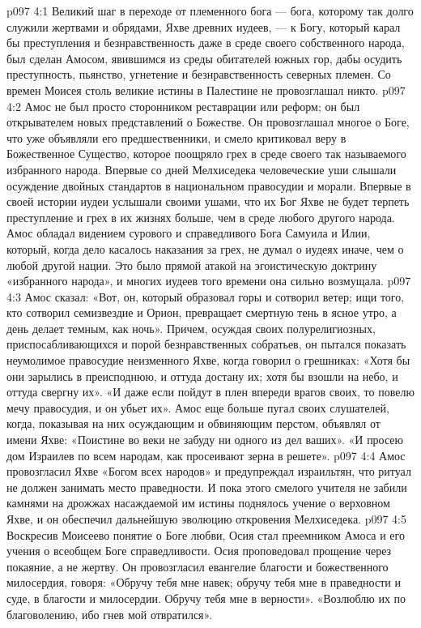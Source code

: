 \vs p097 4:1 Великий шаг в переходе от племенного бога --- бога, которому так долго служили жертвами и обрядами, Яхве древних иудеев, --- к Богу, который карал бы преступления и безнравственность даже в среде своего собственного народа, был сделан Амосом, явившимся из среды обитателей южных гор, дабы осудить преступность, пьянство, угнетение и безнравственность северных племен. Со времен Моисея столь великие истины в Палестине не провозглашал никто.
\vs p097 4:2 Амос не был просто сторонником реставрации или реформ; он был открывателем новых представлений о Божестве. Он провозглашал многое о Боге, что уже объявляли его предшественники, и смело критиковал веру в Божественное Существо, которое поощряло грех в среде своего так называемого избранного народа. Впервые со дней Мелхиседека человеческие уши слышали осуждение двойных стандартов в национальном правосудии и морали. Впервые в своей истории иудеи услышали своими ушами, что их Бог Яхве не будет терпеть преступление и грех в их жизнях больше, чем в среде любого другого народа. Амос обладал видением сурового и справедливого Бога Самуила и Илии, который, когда дело касалось наказания за грех, не думал о иудеях иначе, чем о любой другой нации. Это было прямой атакой на эгоистическую доктрину «избранного народа», и многих иудеев того времени она сильно возмущала.
\vs p097 4:3 Амос сказал: «Вот, он, который образовал горы и сотворил ветер; ищи того, кто сотворил семизвездие и Орион, превращает смертную тень в ясное утро, а день делает темным, как ночь». Причем, осуждая своих полурелигиозных, приспосабливающихся и порой безнравственных собратьев, он пытался показать неумолимое правосудие неизменного Яхве, когда говорил о грешниках: «Хотя бы они зарылись в преисподнюю, и оттуда достану их; хотя бы взошли на небо, и оттуда свергну их». «И даже если пойдут в плен впереди врагов своих, то повелю мечу правосудия, и он убьет их». Амос еще больше пугал своих слушателей, когда, показывая на них осуждающим и обвиняющим перстом, объявлял от имени Яхве: «Поистине во веки не забуду ни одного из дел ваших». «И просею дом Израилев по всем народам, как просеивают зерна в решете».
\vs p097 4:4 Амос провозгласил Яхве «Богом всех народов» и предупреждал израильтян, что ритуал не должен занимать место праведности. И пока этого смелого учителя не забили камнями на дрожжах насаждаемой им истины поднялось учение о верховном Яхве, и он обеспечил дальнейшую эволюцию откровения Мелхиседека.
\vs p097 4:5 \pc Воскресив Моисеево понятие о Боге любви, Осия стал преемником Амоса и его учения о всеобщем Боге справедливости. Осия проповедовал прощение через покаяние, а не жертву. Он провозгласил евангелие благости и божественного милосердия, говоря: «Обручу тебя мне навек; обручу тебя мне в праведности и суде, в благости и милосердии. Обручу тебя мне в верности». «Возлюблю их по благоволению, ибо гнев мой отвратился».

